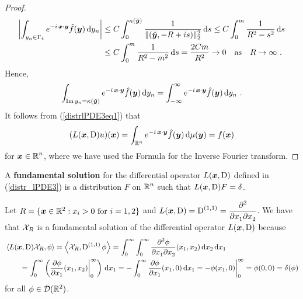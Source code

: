 \begin{proof}
\begin{align*}
\left| \int_{y_n \in \Gamma_4}
e^{-i\, \VEC{x}\cdot\VEC{y}} \hat{f}(\VEC{y}) \dx{y_n} \right|
&\leq C \int_0^{\kappa(\breve{\VEC{y}})}
\frac{1}{\|(\breve{\VEC{y}},-R+is)\|_2^2} \dx{s}
\leq C \int_0^m \frac{1}{ R^2 - s^2} \dx{s} \\
& \leq C \int_0^m \frac{1}{ R^2 - m^2} \dx{s}
= \frac{2Cm}{R^2} \to 0
\quad \text{as} \quad R \to \infty \ .
\end{align*}
Hence,
\[
\int_{\IM y_n = \kappa(\breve{\VEC{y}})}
e^{-i\, \VEC{x}\cdot\VEC{y}} \hat{f}(\VEC{y}) \dx{y_n}
= 
\int_{-\infty}^{\infty}
e^{-i\, \VEC{x}\cdot\VEC{y}} \hat{f}(\VEC{y}) \dx{y_n} \ .
\]
It follows from (\ref{distrlPDE3eq1}) that
\[
(L(\VEC{x},\diff)u)(\VEC{x})
= \int_{\RR^n} e^{-i\, \VEC{x}\cdot\VEC{y}} \hat{f}(\VEC{y}) \dx{\mu(\VEC{y})}
= f(\VEC{x})
\]
for $\displaystyle \VEC{x} \in \RR^n$, where we have used the Formula for the
Inverse Fourier transform.
\end{proof}


\begin{defn}
A {\bfseries fundamental solution} for the
differential operator $L(\VEC{x},\diff)$ defined in (\ref{distr_lPDE3}) is a
distribution $F$ on $\displaystyle \RR^n$ such that
$L(\VEC{x},\diff)F = \delta$.
\end{defn}

\begin{egg}
Let $R = \{\VEC{x} \in \RR^2 : x_i > 0 \ \text{for} \ i=1,2 \}$ and
$\displaystyle L(\VEC{x},\diff) = \diff^{(1,1)}
= \pdydxnm{}{x_1}{x_2}{2}{}{}$.  We have that
$\Chi_R$ is a fundamental solution of the differential operator
$L(\VEC{x},\diff)$ because
\begin{align*}
&\ps{L(\VEC{x},\diff) \Chi_R}{\phi}
= \ps{\Chi_R}{\diff^{(1,1)} \phi}
= \int_0^\infty \int_0^\infty \pdydxnm{\phi}{x_1}{x_2}{2}{}{}(x_1,x_2)
\dx{x_2}\dx{x_1} \\
&\qquad 
= \int_0^\infty \left( \pdydx{\phi}{x_1}(x_1,x_2) \bigg|_0^\infty\right)\dx{x_1}
= -\int_0^\infty \pdydx{\phi}{x_1}(x_1,0) \dx{x_1}
= -\phi(x_1,0) \bigg|_0^\infty = \phi(0,0) = \delta(\phi)
\end{align*}
for all $\phi \in \DD(\RR^2)$.
\end{egg}


